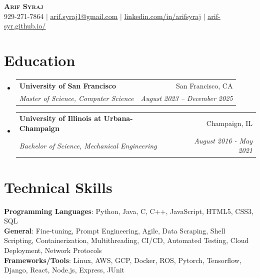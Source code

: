 \documentclass[letterpaper,11pt]{article}
\makeatletter
\newcommand{\resumeSubheading}[4]{
  \vspace{-3pt}\item
    \begin{tabular*}{0.97\textwidth}[t]{l@{\extracolsep{\fill}}r}
      \textbf{#1} & #2 \\
      \textit{\small#3} & \textit{\small #4} \\
    \end{tabular*}\vspace{-7pt}
}
\newcommand{\resumeSubHeadingListStart}
{\begin{itemize}[leftmargin=0.05in, label={}]}
\newcommand{\resumeSubHeadingListEnd}{\end{itemize}}
\makeatother
\begin{document}

\begin{center}
  \textbf{\Huge \scshape Arif Syraj} \\ \vspace{1pt}
  \small 929-271-7864 $|$ \href{mailto:arif.syraj1@gmail.com}{\underline{arif.syraj1@gmail.com}} $|$
  \href{https://linkedin.com/in/arifsyraj}{\underline{linkedin.com/in/arifsyraj}} $|$
  \href{https://arif-syr.github.io/}{\underline{arif-syr.github.io/}}
\end{center}


\section{Education}
\resumeSubHeadingListStart
\resumeSubheading
{University of San Francisco}{San Francisco, CA}
{Master of Science, Computer Science}{August 2023 -- December 2025}

\resumeSubheading
{University of Illinois at Urbana-Champaign}{Champaign, IL}
{Bachelor of Science, Mechanical Engineering}{August 2016 - May 2021}

\resumeSubHeadingListEnd

\section{Technical Skills}
\begin{itemize}[leftmargin=0.15in, label={}]
  \small{\item{
        \textbf{Programming Languages}{: Python, Java, C, C++, JavaScript, HTML5, CSS3, SQL} \\
        \textbf{General}{: Fine-tuning, Prompt Engineering, Agile, Data Scraping, Shell Scripting, Containerization, Multithreading, CI/CD, Automated Testing, Cloud Deployment, Network Protocols} \\
        \textbf{Frameworks/Tools}{: Linux, AWS, GCP, Docker, ROS, Pytorch, Tensorflow, Django, React, Node.js, Express, JUnit}
        }}
\end{itemize}
\end{document}
